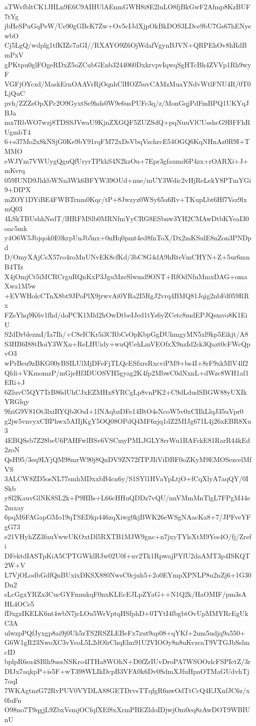 aTWvfbltCK1JHLn9E6C9AIHUlAEnmGWH8i8E2luLO8fjBkGwF2Afmp8KzBUF7tYg
jbHeSPuGqPeW/Ue90gGBcK7Zw+Ov5cIJdXjpOkBkDOS3LDce9bU7Gs67hENyewbO
Cj5LgQ/wdplg1tfKIZc7aGI//RXAYO9Z6OjWdafVgynBJVN+QRPEhOv8hRdBmPxV
gPKtpu0glFOgeRDxZ5oZCubGEnb3244060DxkrvpvIqwqSgHTcBh4ZVVp1Rh9wyF
VGFjOYczd/MaskErnOAAVrRjOqnhClHOZ5uvCAMzMuaYNdvWtlFNU4R/0T0LjQuC
pvh/ZZZsOpXPc2O9GyxtSe9hds0W9e6usPUFc3q/z/MonGqjPdFmBPQ1UKYqJBJa
mx7RbWO7wzj8TDSSJVwaU9KjnZXGQF5ZUZSdQ+pqNuuVlCUsshcG9BFFhRUgmbT4
6+s37Mo2x8kNSjG0Ke9bY91rqFM72xDsVbqVzchrcE54OGQ6KqNHnAz0R9I+TMMO
eWJYm7VWUygQguQfUryrTPkhS4N2kzOu+7Epr3gfaumd6P4zx+rOARXi+J+mKvrq
059IUND9JhkbWNn3Wk6BFYW39OUd+nue/mUY3Wdic2vHjReLekY8PTmYGi9+DIPX
mZOY1DYiBE4FWBTrnm0Kqc/tP+8Jwzyz0WSy65a6Rv+TKupLbt6Hf7Vsz9lxmQ03
4LSkTBUshhNsdT/lHRFMSlb0MRNfmYyCRG8ESbnw3YH2CMAwDtbKYeaI30oac5mk
y4O6W5Jbjqok0E0krpUnJb5nx+0nHq0pmt4ed8fnToX/Dx2mKSulE8nZon3PNDpd
D/OmyXAjCsX57ro4roMnUNvEK8cfKd/3bC8G4dA9hRteVmCHYN+Z+5ur6mnB4TIz
X4jOmjCt5iMCRCrguRQnKxP3JguMzeSlwmd9ONT+RfOdNfnMmxDAG+omaXwa1M5w
+EVWHolcCTnX8bt9JPoPlX9jrwvAi0YRa2I5RgJ2vrq4BMQ81Jqig2nbFd059RRx
FZsYhq9K6v1fhd/doPCK1Mld2hOwDtbeIJed1tYs6yZCetc8mdEPJQsmvo8K1EiU
S2dDrblezmI/Ia7Ih/+C8eICKr5i3CRbCsOpKbpGgDUhmgyMN5xl9kp5Eikjt/A8
S3HB6I88tBoiY3WXn+ReLHUidy+wuQUehLmVEOfxX9nzId2ck3Qazt0cFWcQpvO3
wPrBeu9zBKG00yBSILUlMjDFeFjTLQcESfxrsRxcviPM9+bs4I+8rF9xkMlV4lf2
Qfdi+VKmomzP/mGjeHf3DUOSVH5gyag2K4fp2MbwC0dNxnL+dWzc8WH1af1ERi+J
6ZluvC5QY7TrB86dUhCJxEZMHx8YRCgLp8vnPK2+C9dLdudSBGW88yUXIkYRGlqy
9fziG9V81Ot3lxiRYQb3OuI+1fNAqbzDFe14BtO4sNcoW5v0xCIIhLlqJ35uVpr0
g2jw5vnvyxCBPhwx5AIIjKgY5OQ08OPdQ4MF6zjq1dZ2MIJg671L4j26xEBR8Xu3
4EBQSsb7Z28beU6PAHFwlBSv6VSCmyPMLJGLY8rrWu1BAFckE81RarR44kEd2zoN
QsH95/3eq9LYjQM98mrW90j8QnDV9ZN72fTPJIiViDBF0oZKyM9EMOSezcelMfVS
3ALCW8ZD5osNL77smhMDxxbB4cn6y/S1SYl1HVaYpLtjO+fCqXlyA7aqQY/0ISkb
y8l2KauvGlNK8SL2k+P9HBs+L66cHHuQDDz7vQU/nnVMmMnTlgL7FPgM44e2mxay
6pqM6FAGapGMo19qTSEDkp446zqXiwg0kjBWK26eWSgNAacKa8+7/JPFveYFgG73
e21VHyhZZ3fuuVwwUKOxtDl5RXTB1MJW9gnc+n7jxyTYlsXtM9Yes4O/fj/Zrefi
DFektdIASTpKiA5CPTGWklRJw02U0f+uv2Tk1RpwajPYfU2daAMT3p4ISKQT2W+V
L7VjOLodbGdfQnBUxixDKSX880NwsC0cjuh5+2o0EYmpXPNLP8u2nZj6+1G30Dn2
sLcGgxYRZx3CucGYFmmkqF0nxKLEcEJLpZYaG++N1Q2k/HaOMIF/pm3sAHL4OCe5
fDxgzIKELK6nt4wbN7jcLOu5WrVptqHSfphD+0TYtI4fbgbtOvUpMMYRcEgUkC3A
ulwzpPQfJyxgp8ai9j0Uh5zTS2RSZLEBeFx7zut9ap08+qYKf+2um5udjq9a550+
G6W1gR23NwoXC3vYeoL5L2dOlrChqElm91U2VIOOy8n8uKvzcaT9VTGJbSslmcID
bplpR6su4SBlh9ussNSKro4ITHa8WOhN+D0fZrIUvDroPA7WSOOzlcFSPIctZ/3r
DIJx7aqkpP+is5F+wT398WLIkDcpB3VFA0k6Dv0SdmXJfuHpaOTMaGUdvhTj7oqI
7WKAgtnzG72RvPUV0VYDLA88GETDrvsTTqfgR6nwOdTtCcQ4EJXnfJC6z/x0luFn
O98no7T9qgjL9ZbxVsmjOCfqfXEf8xXrmPBEZldoIDjwjOm0eq8zAwDOT9WBIUnU
